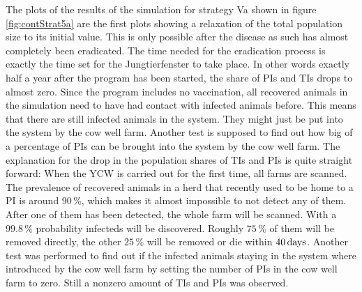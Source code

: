 The plots of the results of the simulation for strategy Va shown in figure \ref{fig:contStrat5a} are the first plots showing a relaxation of the total population size to its initial value. This is only possible after the disease as such has almost completely been eradicated. The time needed for the eradication process is exactly the time set for the Jungtierfenster to take place. In other words exactly half a year after the program has been started, the share of PIs and TIs drops to almost zero. 
Since the program includes no vaccination, all recovered animals in the simulation need to have had contact with infected animals before. This means that there are still infected animals in the system. They might just be put into the system by the cow well farm. Another test is supposed to find out how big of a percentage of PIs can be brought into the system by the cow well farm. 
The explanation for the drop in the population shares of TIs and PIs is quite straight forward: When the YCW is carried out for the first time, all farms are scanned. The prevalence of recovered animals in a herd that recently used to be home to a PI is around $90\,\%$, which makes it almost impossible to not detect any of them. After one of them has been detected, the whole farm will be scanned. With a $99.8\,\%$ probability infecteds will be discovered. Roughly $75\,\%$ of them will be removed directly, the other $25\,\%$ will be removed or die within $40\,\text{days}$. Another test was performed to find out if the infected animals staying in the system where introduced by the cow well farm by setting the number of PIs in the cow well farm to zero. Still a nonzero amount of TIs and PIs was observed.
